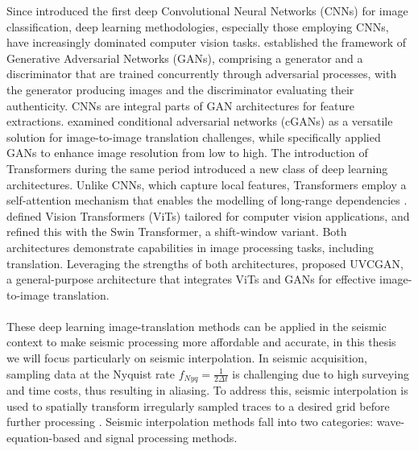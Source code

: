 Since  introduced the first deep Convolutional Neural Networks (CNNs) for image classification, deep learning methodologies, especially those employing CNNs, have increasingly dominated computer vision tasks.  established the framework of Generative Adversarial Networks (GANs), comprising a generator and a discriminator that are trained concurrently through adversarial processes, with the generator producing images and the discriminator evaluating their authenticity. CNNs are integral parts of GAN architectures for feature extractions.  examined conditional adversarial networks (cGANs) as a versatile solution for image-to-image translation challenges, while  specifically applied GANs to enhance image resolution from low to high. The introduction of Transformers during the same period introduced a new class of deep learning architectures. Unlike CNNs, which capture local features, Transformers employ a self-attention mechanism that enables the modelling of long-range dependencies \cite{vaswani2017attention}.  defined Vision Transformers (ViTs) tailored for computer vision applications, and  refined this with the Swin Transformer, a shift-window variant. Both architectures demonstrate capabilities in image processing tasks, including translation. Leveraging the strengths of both architectures,  proposed UVCGAN, a general-purpose architecture that integrates ViTs and GANs for effective image-to-image translation.
\\\\
These deep learning image-translation methods can be applied in the seismic context to make seismic processing more affordable and accurate, in this thesis we will focus particularly on seismic interpolation. In seismic acquisition, sampling data at the Nyquist rate \(f_{Nyq} = \frac{1}{2\Delta t}\) is challenging due to high surveying and time costs, thus resulting in aliasing. To address this, seismic interpolation is used to spatially transform irregularly sampled traces to a desired grid before further processing \cite{claerbout1976fundamentals}. Seismic interpolation methods fall into two categories: wave-equation-based and signal processing methods.
